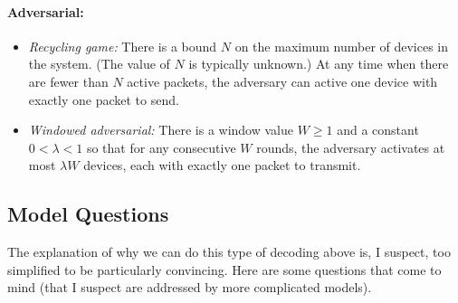 \paragraph{Adversarial:}
\begin{itemize}
	\item \emph{Recycling game:} There is a bound $N$ on the maximum number of devices in the system.  (The value of $N$ is typically unknown.)  At any time when there are fewer than $N$ active packets, the adversary can active one device with exactly one packet to send.

	\item \emph{Windowed adversarial:}  There is a window value $W \geq 1$ and a constant $0 < \lambda < 1$ so that for any consecutive $W$ rounds, the adversary activates at most $\lambda W$ devices, each with exactly one packet to transmit.
\end{itemize}	

	

\subsection{Model Questions}  

The explanation of why we can do this type of decoding above is, I suspect, too simplified to be particularly convincing.  Here are some questions that come to mind (that I suspect are addressed by more complicated models).

